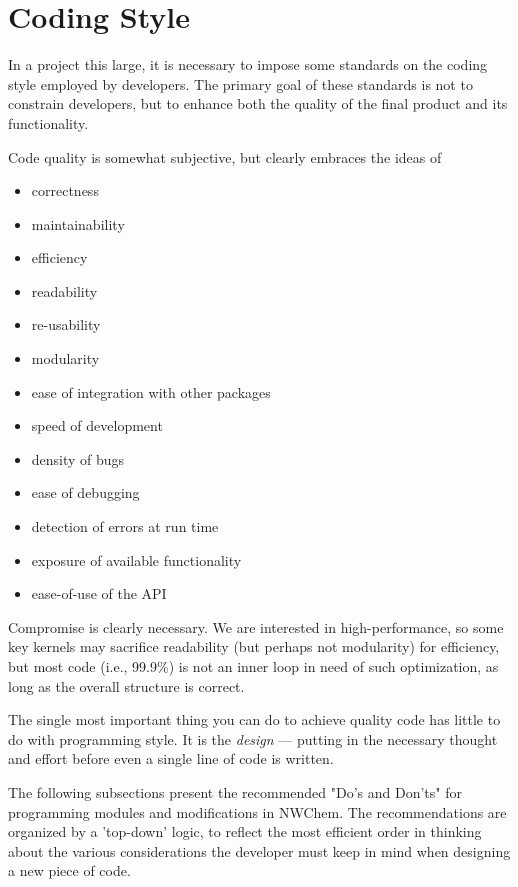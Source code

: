\section{Coding Style}
\label{sec:coding-style}

In a project this large, it is necessary to impose some standards on
the coding style employed by developers.  The primary goal of these
standards is not to constrain developers, but to enhance both the
quality of the final product and its functionality. 

Code quality is somewhat subjective, but clearly embraces the ideas of
\begin{itemize}
\item correctness 
\item maintainability 
\item efficiency
\item readability 
\item re-usability
\item modularity 
\item ease of integration with other packages
\item speed of development
\item density of bugs
\item ease of debugging
\item detection of errors at run time
\item exposure of available functionality
\item ease-of-use of the API
\end{itemize}
Compromise is clearly necessary. We are interested in
high-performance, so some key kernels may sacrifice readability (but
perhaps not modularity) for efficiency, but most code (i.e., 99.9\%)
is not an inner loop in need of such optimization, as long as the
overall structure is correct.

The single most important thing you can do to achieve quality code has
little to do with programming style. It is the {\em design} --- putting
in the necessary thought and effort before even a single line of code
is written. 

The following subsections present the recommended "Do's and Don'ts"
for programming modules and modifications in NWChem.
The recommendations are organized by a 'top-down' logic, to reflect the
most efficient order in thinking about the various considerations
the developer must keep in mind when designing a new piece of code.


